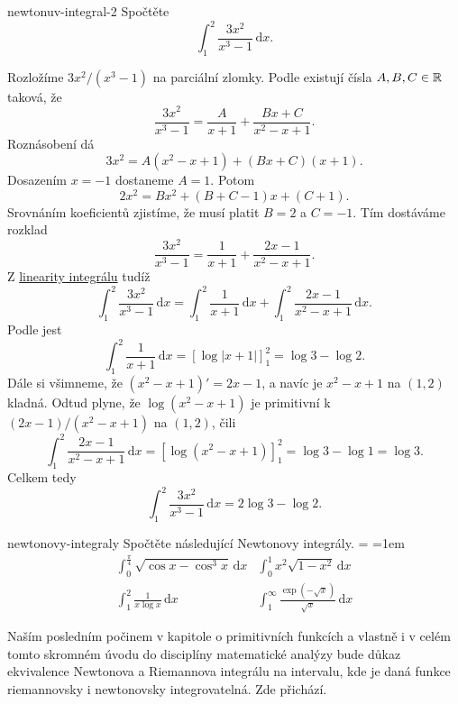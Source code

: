 \begin{problem}{}{newtonuv-integral-2}
 Spočtěte
 \[
  \int_{1}^{2} \frac{3x^2}{x^3 - 1} \, \mathrm{d}x.
 \]
\end{problem}
\begin{probsol}
 Rozložíme $3x^2 / (x^3 - 1)$ na parciální zlomky. Podle
  existují čísla $A,B,C \in \mathbb{R}$
 taková, že
 \[
  \frac{3x^2}{x^3 - 1} = \frac{A}{x+1} + \frac{Bx + C}{x^2 - x + 1}.
 \]
 Roznásobení dá
 \[
  3x^2 = A(x^2 - x + 1) + (Bx + C)(x + 1).
 \]
 Dosazením $x = -1$ dostaneme $A = 1$. Potom
 \[
  2x^2 = Bx^2 + (B + C - 1)x + (C + 1). 
 \]
 Srovnáním koeficientů zjistíme, že musí platit $B = 2$ a $C = -1$. Tím
 dostáváme rozklad
 \[
  \frac{3x^2}{x^3 - 1} = \frac{1}{x+1} + \frac{2x - 1}{x^2 - x + 1}.
 \]
 Z \hyperref[thm:linearita-newtonova-integralu]{linearity integrálu} tudíž
 \[
  \int_{1}^{2} \frac{3x^2}{x^3 - 1} \, \mathrm{d}x = \int_{1}^{2} \frac{1}{x+1}
  \, \mathrm{d}x + \int_{1}^{2} \frac{2x - 1}{x^2 - x + 1} \, \mathrm{d}x.
 \]
 Podle  jest
 \[
  \int_{1}^{2} \frac{1}{x+1} \, \mathrm{d}x = \left[ \log|x+1|\right]_1^{2} =
  \log 3 - \log 2.
 \]
 Dále si všimneme, že $(x^2 - x + 1)' = 2x - 1$, a navíc je $x^2 - x + 1$ na
 $(1,2)$ kladná. Odtud plyne, že $\log(x^2 - x + 1)$ je primitivní k $(2x - 1) /
 (x^2 - x + 1)$ na $(1,2)$, čili
 \[
  \int_{1}^{2} \frac{2x - 1}{x^2 - x + 1} \, \mathrm{d}x = \left[ \log(x^2 - x +
  1)\right]_1^{2} = \log 3 - \log 1 = \log 3.
 \]
 Celkem tedy
 \[
  \int_{1}^{2} \frac{3x^2}{x^3 - 1} \, \mathrm{d}x = 2 \log 3 - \log 2. 
 \]
\end{probsol}

\begin{exercise}{}{newtonovy-integraly}
 Spočtěte následující Newtonovy integrály.
 {\everymath={\displaystyle}
  \arraycolsep=1em
  \[
   \begin{array}{ll}
    \int_{0}^{\frac{\pi}{4}} \sqrt{\cos x - \cos^3 x} \, \mathrm{d}x &
    \int_{0}^{1} x^2 \sqrt{1 - x^2} \, \mathrm{d}x\\[2em]
    \int_{1}^{2} \frac{1}{x\log x} \, \mathrm{d}x & \int_{1}^{\infty}
    \frac{\exp(-\sqrt{x})}{\sqrt{x}} \, \mathrm{d}x
   \end{array}
  \]
 }
\end{exercise}

Naším posledním počinem v kapitole o primitivních funkcích a vlastně i v celém
tomto skromném úvodu do disciplíny matematické analýzy bude důkaz ekvivalence
Newtonova a Riemannova integrálu na intervalu, kde je daná funkce riemannovsky i
newtonovsky integrovatelná. Zde přichází.

